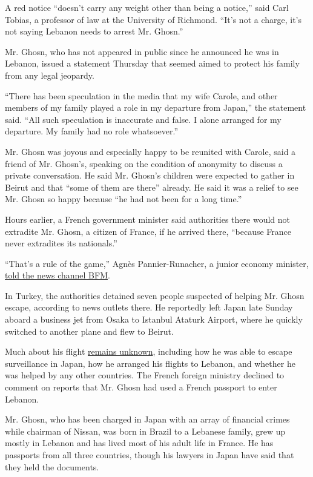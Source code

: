 A red notice ``doesn't carry any weight other than being a notice,''
said Carl Tobias, a professor of law at the University of Richmond.
``It's not a charge, it's not saying Lebanon needs to arrest Mr.
Ghosn.''

Mr. Ghosn, who has not appeared in public since he announced he was in
Lebanon, issued a statement Thursday that seemed aimed to protect his
family from any legal jeopardy.

``There has been speculation in the media that my wife Carole, and other
members of my family played a role in my departure from Japan,'' the
statement said. ``All such speculation is inaccurate and false. I alone
arranged for my departure. My family had no role whatsoever.''

Mr. Ghosn was joyous and especially happy to be reunited with Carole,
said a friend of Mr. Ghosn's, speaking on the condition of anonymity to
discuss a private conversation. He said Mr. Ghosn's children were
expected to gather in Beirut and that ``some of them are there''
already. He said it was a relief to see Mr. Ghosn so happy because ``he
had not been for a long time.''

Hours earlier, a French government minister said authorities there would
not extradite Mr. Ghosn, a citizen of France, if he arrived there,
``because France never extradites its nationals.''

``That's a rule of the game,'' Agnès Pannier-Runacher, a junior economy
minister,
\href{https://www.bfmtv.com/mediaplayer/video/agnes-pannier-runacher-affirme-que-si-carlos-ghosn-venait-en-france-il-ne-serait-pas-extrade-1212117.html}{told
the news channel BFM}.

In Turkey, the authorities detained seven people suspected of helping
Mr. Ghosn escape, according to news outlets there. He reportedly left
Japan late Sunday aboard a business jet from Osaka to Istanbul Ataturk
Airport, where he quickly switched to another plane and flew to Beirut.

Much about his flight
\href{https://www.nytimes.com/2019/12/31/business/carlos-ghosn.html?action=click\&module=RelatedLinks\&pgtype=Article}{remains
unknown}, including how he was able to escape surveillance in Japan, how
he arranged his flights to Lebanon, and whether he was helped by any
other countries. The French foreign ministry declined to comment on
reports that Mr. Ghosn had used a French passport to enter Lebanon.

Mr. Ghosn, who has been charged in Japan with an array of financial
crimes while chairman of Nissan, was born in Brazil to a Lebanese
family, grew up mostly in Lebanon and has lived most of his adult life
in France. He has passports from all three countries, though his lawyers
in Japan have said that they held the documents.

